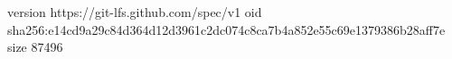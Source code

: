 version https://git-lfs.github.com/spec/v1
oid sha256:e14cd9a29c84d364d12d3961c2dc074c8ca7b4a852e55c69e1379386b28aff7e
size 87496
